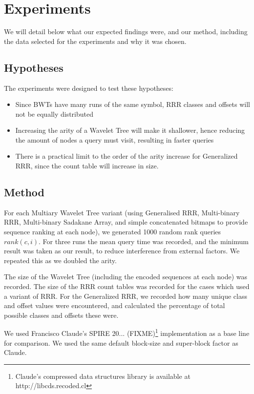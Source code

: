 \section{Experiments}
We will detail below what our expected findings were, and our method, including 
the data selected for the experiments and why it was chosen.

\subsection{Hypotheses}
The experiments were designed to test these hypotheses:

\begin{itemize}
    \item 	
			Since BWTs have many runs of the same symbol, RRR classes and 
			offsets will not be equally distributed

    \item 	
			Increasing the arity of a Wavelet Tree will make it shallower,
		   	hence reducing the amount of nodes a query must visit, resulting
		   	in faster queries
			
    \item  
			There is a practical limit to the order of the arity increase for 
		   	Generalized RRR, since the count table will increase in size.
\end{itemize}

\subsection{Method}
For each Multiary Wavelet Tree variant (using Generalised RRR, Multi-binary
RRR, Multi-binary Sadakane Array, and simple concatenated bitmaps to provide
sequence ranking at each node), we generated 1000 random rank queries $rank(c, 
i)$. For three runs the mean query time was recorded, and the minimum result was
taken as our result, to reduce interference from external factors. We repeated
this as we doubled the arity.

The size of  the Wavelet Tree (including the encoded sequences at each node) was 
recorded. The size of the RRR count tables was recorded for the cases which used 
a variant of RRR. For the Generalized RRR, we recorded how many unique class and 
offset values were encountered, and calculated the percentage of total possible 
classes and offsets these were.

We used Francisco Claude's SPIRE 20... (FIXME)\footnote{Claude's compressed data 
structures library is available at http://libcds.recoded.cl} implementation as a 
base line for comparison. We used the same default block-size and 
super-block factor as Claude.

